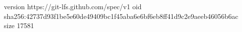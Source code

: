 version https://git-lfs.github.com/spec/v1
oid sha256:42737d93f1be5e60de49409bc1f45aba6e6bf6eb8ff41d9c2e9aeeb46056b6ac
size 17581

